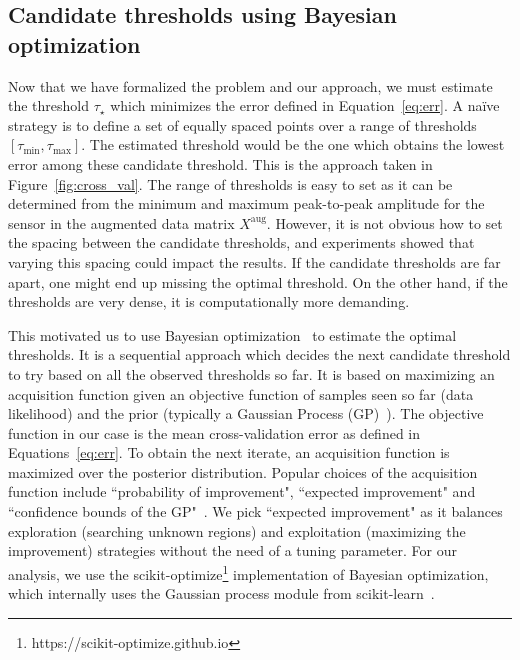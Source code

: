 \subsection{Candidate thresholds using Bayesian optimization}
\label{sec:bayesian_opt}
Now that we have formalized the problem and our approach, we must estimate the threshold $\tau_{\star}$ which minimizes the error defined in Equation~\eqref{eq:err}. A na\"ive strategy is to define a set of equally spaced points over a range of thresholds $[\tau_{\min}, \tau_{\max}]$. The estimated threshold would be the one which obtains the lowest error among these candidate threshold. This is the approach taken in Figure~\ref{fig:cross_val}. The range of thresholds is easy to set as it can be determined from the minimum and maximum peak-to-peak amplitude for the sensor in the augmented data matrix $X^{\textrm{aug}}$. However, it is not obvious how to set the spacing between the candidate thresholds, and experiments showed that varying this spacing could impact the results. If the candidate thresholds are far apart, one might end up missing the optimal threshold. On the other hand, if the thresholds are very dense, it is computationally more demanding.

This motivated us to use Bayesian optimization~\citep{snoek2012practical, bergstra2011algorithms} to estimate the optimal thresholds. It is a sequential approach which decides the next candidate threshold to try based on all the observed thresholds so far. It is based on maximizing an acquisition function given an objective function of samples seen so far (data likelihood) and the prior (typically a Gaussian Process (GP)~\citep{rasmussen2006gaussian}). The objective function in our case is the mean cross-validation error as defined in Equations~\eqref{eq:err}. To obtain the next iterate, an acquisition function is maximized over the posterior distribution. Popular choices of the acquisition function include ``probability of improvement", ``expected improvement" and ``confidence bounds of the GP"~\citep{snoek2012practical}. We pick ``expected improvement" as it balances exploration (searching unknown regions) and exploitation (maximizing the improvement) strategies without the need of a tuning parameter. For our analysis, we use the scikit-optimize\footnote{https://scikit-optimize.github.io} implementation of Bayesian optimization, which internally uses the Gaussian process module from scikit-learn~\citep{scikit-learn}.

